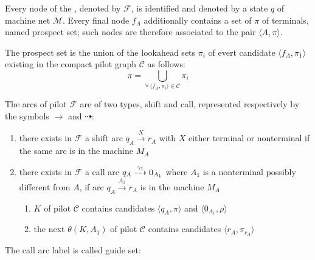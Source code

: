 \documentclass[english]{article}
\begin{document}
\bigskip
Every node of the \PCFG, denoted by \(\mathcal{F}\), is identified and denoted by a state \(q\) of machine net \(\mathcal{M}\).
Every final node \(f_A\) additionally contains a set of \(\pi\) of terminals, named prospect set;
such nodes are therefore associated to the pair \(\langle A, \pi \rangle\).

The prospect set is the union of the lookahead sets \(\pi_i\) of evert candidate \(\langle f_A, \pi_1\rangle\) existing in the compact pilot graph \(\mathcal{C}\) as follows:
\[ \pi = \bigcup_{\forall \, \langle f_A, \pi_i \rangle \in \mathcal{C}} \pi_i \]

\bigskip
The arcs of pilot \(\mathcal{F}\) are of two types, shift and call, represented respectively by the symbols \(\rightarrow\) and \(\dashrightarrow\):

\begin{enumerate}
  \item there exists in \(\mathcal{F}\) a shift arc \(q_A \xrightarrow{X} r_A\) with \(X\) either terminal or nonterminal if the same arc is in the machine \(M_A\)
  \item there exists in \(\mathcal{F}\) a call arc \(q_A \stackrel{\gamma_1}{\dashrightarrow} 0_{A_1}\) where \(A_1\) is a nonterminal possibly different from \(A\), if arc \(q_A \xrightarrow{A_1} r_A\) is in the machine \(M_A\)
        \begin{enumerate}[label=\(\rightarrow\) necessary condition \arabic*., leftmargin=*, labelindent=1em, widest*=24]
          \item \mstate \(K\) of pilot \(\mathcal{C}\) contains candidates \(\langle q_A, \pi \rangle\) and \(\langle 0_{A_1}, \rho\rangle\)
          \item the next \mstate \(\theta(K, A_1)\) of pilot \(\mathcal{C}\) contains candidates \(\langle r_A, \pi_{r_A} \rangle\)
        \end{enumerate}
\end{enumerate}

\bigskip
The call arc label is called guide set:
\end{document}
